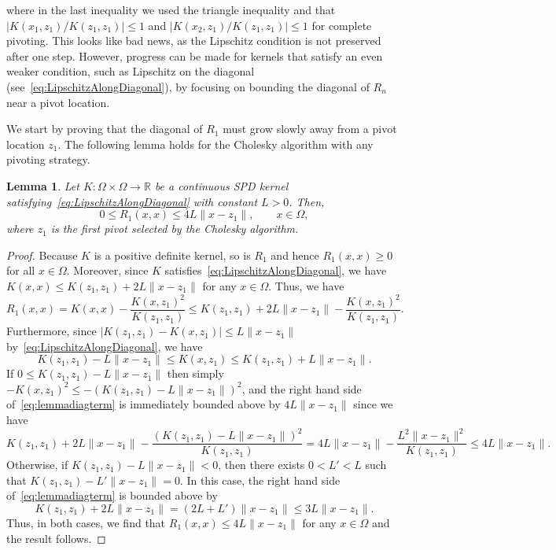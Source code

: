 \documentclass{amsart}
\newtheorem{lemma}[theorem]{Lemma}
\theoremstyle{definition}
\theoremstyle{remark}
\begin{document}
where in the last inequality we used the triangle inequality and that $|K(x_1,z_1)/K(z_1,z_1)|\leq 1$ and $|K(x_2,z_1)/K(z_1,z_1)|\leq 1$ for complete pivoting. This looks like bad news, as the Lipschitz condition is not preserved after one step. However, progress can be made for kernels that satisfy an even weaker condition, such as Lipschitz on the diagonal (see~\cref{eq:LipschitzAlongDiagonal}), by focusing on bounding the diagonal of $R_n$ near a pivot location. 

We start by proving that the diagonal of $R_1$ must grow slowly away from a pivot location $z_1$. The following lemma holds for the Cholesky algorithm with any pivoting strategy. 
\begin{lemma}\label{lem:lipschitzchange}
Let $K:\Omega\times \Omega\to\mathbb{R}$ be a continuous SPD kernel satisfying~\cref{eq:LipschitzAlongDiagonal} with constant $L>0$. Then, 
\begin{equation*}
    0\leq R_1(x, x) \leq 4L \|x - z_1\|, \qquad x\in\Omega,
\end{equation*} 
where $z_1$ is the first pivot selected by the Cholesky algorithm. 
\end{lemma}
\begin{proof}
Because $K$ is a positive definite kernel, so is $R_1$ and hence $R_1(x,x)\geq 0$ for all $x\in\Omega$.
Moreover, since $K$ satisfies~\cref{eq:LipschitzAlongDiagonal}, we have $K(x, x) \leq K(z_1, z_1) + 2L\|x-z_1\|$ for any $x\in\Omega$. Thus, we have 
\begin{equation}\label{eq:lemmadiagterm}
    R_1(x, x) = K(x, x) - \frac{K(x, z_1)^2}{K(z_1, z_1)} \leq K(z_1, z_1) + 2L\|x-z_1\| - \frac{K(x, z_1)^2}{K(z_1, z_1)}. 
\end{equation}
Furthermore, since $|K(z_1, z_1) - K(x,z_1)| \leq L \|x-z_1\|$ by~\cref{eq:LipschitzAlongDiagonal}, we have
\begin{equation*}
    K(z_1, z_1) - L\|x-z_1\| \leq K(x, z_1) \leq K(z_1, z_1) + L\|x-z_1\|. 
\end{equation*}
If $0\leq K(z_1, z_1)-L\|x-z_1\|$ then simply $-K(x, z_1)^2\leq -(K(z_1, z_1)- L\|x-z_1\|)^2$, and the right hand side of~\cref{eq:lemmadiagterm} is immediately bounded above by $4L\|x-z_1\|$ since we have
\begin{equation*}
    K(z_1, z_1) + 2L\|x-z_1\| - \frac{(K(z_1, z_1)-L\|x-z_1\|)^2}{K(z_1, z_1)} = 4L\|x-z_1\| - \frac{L^2\|x-z_1\|^2}{K(z_1, z_1)}\leq 4L \|x-z_1\|.
\end{equation*}
Otherwise, if $K(z_1, z_1)-L\|x-z_1\| < 0 $, then there exists $0<L'<L$ such that $K(z_1, z_1)-L'\|x-z_1\|=0$. In this case, the right hand side of~\cref{eq:lemmadiagterm} is bounded above by
\begin{equation*}
    K(z_1, z_1) + 2L\|x-z_1\| = (2L + L')\|x-z_1\| \leq 3L\|x-z_1\|.
\end{equation*}
Thus, in both cases, we find that $R_1(x, x) \leq 4 L \|x - z_1\|$ for any $x\in\Omega$ and the result follows. 
\end{proof}
\end{document}
